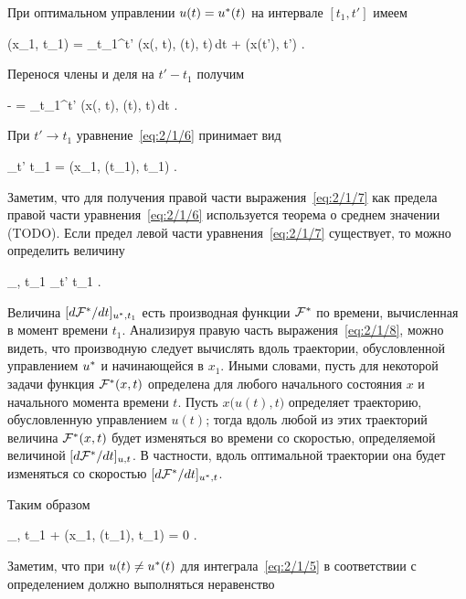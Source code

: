 При оптимальном управлении $u(t) = u^{*}(t)$ на интервале $[t_1, t']$ имеем

    \optF(x_1, t_1) = \int\limits_{t_1}^{t'} \funcL\bigl(x(\optU, t), \optU(t), t\bigr)\,dt + \optF\bigl(x(t'), t'\bigr) \mbox{.}
\eeq

Перенося члены и деля на $t' - t_1$ получим

    - =  \int\limits_{t_1}^{t'} \funcL\bigl(x(\optU, t), \optU(t), t\bigr)\,dt \mbox{.}
\eeq

При $t' \to t_1$ уравнение~\ref{eq:2/1/6} принимает вид

    \lim_{t' \to t_1}  = \funcL\bigl(x_1, \optU(t_1), t_1\bigr) \mbox{.}
\eeq

Заметим, что для получения правой части выражения~\ref{eq:2/1/7} как предела правой части уравнения~\ref{eq:2/1/6} используется теорема о среднем значении (TODO). Если предел левой части уравнения~\ref{eq:2/1/7} существует, то можно определить величину

    _{\optU, t_1} \eqdef \lim_{t' \to t_1}  \mbox{.}
\eeq

Величина $[ d \mathcal{F}^{*} / d t ]_{u^{*}, t_1}$ есть производная функции $\mathcal{F}^{*}$ по времени, вычисленная в момент времени $t_1$. Анализируя правую часть выражения~\ref{eq:2/1/8}, можно видеть, что производную следует вычислять вдоль траектории, обусловленной управлением $u^{*}$ и начинающейся в $x_1$. Иными словами, пусть для некоторой задачи функция $\mathcal{F}^{*}(x, t)$ определена для любого начального состояния $x$ и начального момента времени $t$. Пусть $x\bigl( u(t), t \bigr)$ определяет траекторию, обусловленную управлением $u(t)$; тогда вдоль любой из этих траекторий величина $\mathcal{F}^{*}(x, t)$ будет изменяться во времени со скоростью, определяемой величиной $[ d \mathcal{F}^{*} / d t ]_{u, t}$. В частности, вдоль оптимальной траектории она будет изменяться со скоростью $[ d \mathcal{F}^{*} / d t ]_{u^{*}, t}$.

Таким образом

    _{\optU, t_1} + \funcL\bigl(x_1, \optU(t_1), t_1\bigr) = 0 \mbox{.}
\eeq

Заметим, что при $u(t) \neq u^{*}(t)$ для интеграла~\ref{eq:2/1/5} в соответствии с определением должно выполняться неравенство

